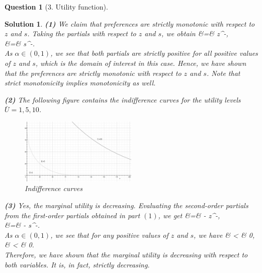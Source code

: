 \documentclass{article} %
\def\eQb#1\eQe{\begin{eqnarray*}#1\end{eqnarray*}}
\theoremstyle{quest}
\newtheorem*{question}{Question}
\newtheorem*{solution}{Solution}
\begin{document}
\begin{question}[3. Utility function]
\end{question}
\begin{solution}
\textbf{(1)} We claim that preferences are strictly monotonic with respect to $z$ and $s$.
Taking the partials with respect to $z$ and $s$, we obtain
\eQb
\dfrac{\partial U}{\partial z} &=&  z^{-}, \\
 &=&  s^{-}. \\
\eQe
As $\alpha \in (0,1)$, we see that both partials are strictly positive for all positive
values of $z$ and $s$, which is the domain of interest in this case. Hence, we have shown
that the preferences are strictly monotonic with respect to $z$ and $s$. Note 
that strict monotonicity implies monotonicity as well.

\pagebreak

\textbf{(2)} 
The following figure contains the indifference curves for the utility levels 
$\bar{U} = 1, 5, 10$. 
\begin{figure}[h!]
  \caption{Indifference curves}
    \centering
  \includegraphics[width=0.5\textwidth]{hw1_indiff.jpg}
\end{figure}


\smallskip

\textbf{(3)} 
Yes, the marginal utility is decreasing. Evaluating the second-order partials
from the first-order partials obtained in part $(1)$, we get
\eQb
\dfrac{\partial^2 U}{\partial z^2} &=& - z^{-}, \\
 &=& - s^{-}. \\
\eQe
As $\alpha \in (0,1)$, we see that for any positive values of $z$ and $s$, we have 
\eQb
\dfrac{\partial^2 U}{\partial z^2} & < & 0, \\
 & < & 0. \\
\eQe
Therefore, we have shown that the marginal utility is decreasing with 
respect to both variables. It is, in fact,
strictly decreasing.


\end{solution}
\end{document}
